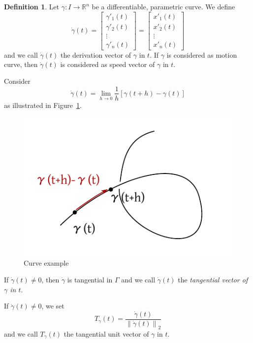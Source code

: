 \documentclass[a4paper,landscape,twocolumn]{article}
\theoremstyle{definition}
\newtheorem{defi}{Definition}
\newcommand\norm[1]{\left\|#1\right\|}
\begin{document}
\begin{defi}
  Let $\gamma: I \to \mathbb R^n$ be a differentiable, parametric curve.
  We define
  \[
    \dot{\gamma}(t) =
    \begin{bmatrix} \gamma'_1(t) \\ \gamma'_2(t) \\ \vdots \\ \gamma'_n(t) \end{bmatrix}
    = \begin{bmatrix} x'_1(t) \\ x'_2(t) \\ \vdots \\ x'_n(t) \end{bmatrix}
  \]
  and we call $\dot\gamma(t)$ the derivation vector of $\gamma$ in $t$.
  If $\gamma$ is considered as motion curve, then $\dot\gamma(t)$ is considered as
  speed vector of $\gamma$ in $t$.

  Consider
  \[ \dot{\gamma}(t) = \lim_{h\to 0} \frac{1}{h} \left[\gamma(t + h) - \gamma(t)\right] \]
  as illustrated in Figure~\ref{img:curve_example}.

  \begin{figure}[!h]
    \begin{center}
      \includegraphics{img/curve_example.pdf}
      \caption{Curve example}
      \label{img:curve_example}
    \end{center}
  \end{figure}

  If $\dot{\gamma}(t) \neq 0$, then $\dot{\gamma}$ is tangential in $\Gamma$
  and we call $\dot\gamma(t)$ the \emph{tangential vector of $\gamma$ in $t$}.

  If $\dot\gamma(t) \neq 0$, we set
  \[ T_\gamma(t) = \frac{\dot\gamma(t)}{\norm{\dot\gamma(t)}_2} \]
  and we call $T_\gamma(t)$ the tangential unit vector of $\gamma$ in $t$.
\end{defi}
\end{document}
